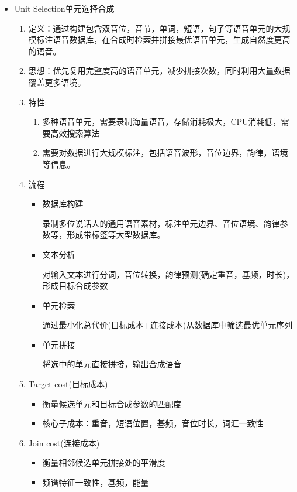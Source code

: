 \documentclass[UTF8]{ctexart}
\begin{document}
\begin{itemize}
    \item Unit Selection单元选择合成
    \begin{enumerate}
        \item 定义：通过构建包含双音位，音节，单词，短语，句子等语音单元的大规模标注语音数据库，在合成时检索并拼接最优语音单元，生成自然度更高的语音。
        \item 思想：优先复用完整度高的语音单元，减少拼接次数，同时利用大量数据覆盖更多语境。
        \item 特性:
        \begin{enumerate}
            \item 多种语音单元，需要录制海量语音，存储消耗极大，CPU消耗低，需要高效搜索算法
            \item 需要对数据进行大规模标注，包括语音波形，音位边界，韵律，语境等信息。
        \end{enumerate}
        \item 流程
        \begin{itemize}
            \item 数据库构建
            
            录制多位说话人的通用语音素材，标注单元边界、音位语境、韵律参数等，形成带标签等大型数据库。
            \item 文本分析
            
            对输入文本进行分词，音位转换，韵律预测(确定重音，基频，时长)，形成目标合成参数
            \item 单元检索
            
            通过最小化总代价(目标成本+连接成本)从数据库中筛选最优单元序列
            \item 单元拼接
            
            将选中的单元直接拼接，输出合成语音
        \end{itemize}
        \item Target cost(目标成本)
        
        \begin{itemize}
            \item 衡量候选单元和目标合成参数的匹配度
            \item 核心子成本：重音，短语位置，基频，音位时长，词汇一致性
        \end{itemize}
        \item Join cost(连接成本)
        
        \begin{itemize}
            \item 衡量相邻候选单元拼接处的平滑度
            \item 频谱特征一致性，基频，能量
        \end{itemize}


\end{enumerate}
\end{itemize}
\end{document}
